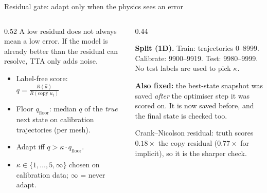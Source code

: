 \documentclass[aspectratio=169,11pt]{beamer}
\begin{document}
\begin{frame}{Residual gate: adapt only when the physics sees an error}
\begin{columns}[T]
\begin{column}{0.52\textwidth}
\small
A low residual does not always mean a low error. If the model is already better than the residual can resolve, TTA only adds noise.
\vspace{4pt}
\begin{itemize}\setlength{\itemsep}{2pt}
\item Label-free score: \\[2pt]
  $\displaystyle q=\frac{R(\hat u)}{R(\text{copy } u_t)}$
\item Floor $q_{\text{floor}}$: median $q$ of the \emph{true} next state on calibration trajectories (per mesh).
\item Adapt iff $q > \kappa \cdot q_{\text{floor}}$.
\item $\kappa \in \{1,\dots,5,\infty\}$ chosen on calibration data; $\infty$ = never adapt.
\end{itemize}
\end{column}
\begin{column}{0.44\textwidth}
\begin{idea}
\textbf{Split (1D).} Train: trajectories 0--8999. Calibrate: 9900--9919. Test: 9980--9999. No test labels are used to pick $\kappa$.
\end{idea}
\vspace{2pt}
\begin{finding}
\textbf{Also fixed:} the best-state snapshot was saved \emph{after} the optimiser step it was scored on. It is now saved before, and the final state is checked too.
\end{finding}
\vspace{2pt}
{\footnotesize\color{muted} Crank--Nicolson residual: truth scores $0.18\times$ the copy residual ($0.77\times$ for implicit), so it is the sharper check.}
\end{column}
\end{columns}
\end{frame}
\end{document}
